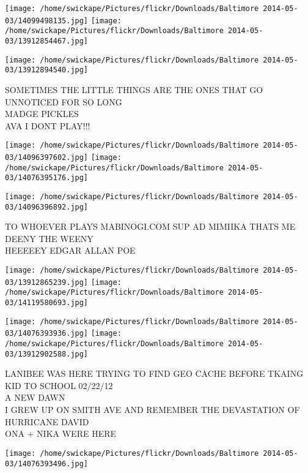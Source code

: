 \documentclass[10pt,letterpaper]{article}
\begin{document}
\texttt{[image: /home/swickape/Pictures/flickr/Downloads/Baltimore 2014-05-03/14099498135.jpg]}
\texttt{[image: /home/swickape/Pictures/flickr/Downloads/Baltimore 2014-05-03/13912854467.jpg]}

\vspace{0.25in}
\texttt{[image: /home/swickape/Pictures/flickr/Downloads/Baltimore 2014-05-03/13912894540.jpg]}

SOMETIMES THE LITTLE THINGS ARE THE ONES THAT GO UNNOTICED FOR SO LONG\\
MADGE PICKLES\\
AVA I DONT PLAY!!!\\
\pagebreak

\texttt{[image: /home/swickape/Pictures/flickr/Downloads/Baltimore 2014-05-03/14096397602.jpg]}
\texttt{[image: /home/swickape/Pictures/flickr/Downloads/Baltimore 2014-05-03/14076395176.jpg]}

\vspace{0.25in}
\texttt{[image: /home/swickape/Pictures/flickr/Downloads/Baltimore 2014-05-03/14096396892.jpg]}

TO WHOEVER PLAYS MABINOGI.COM SUP AD MIMIIKA THATS ME\\
DEENY THE WEENY\\
HEEEEEY EDGAR ALLAN POE\\
\pagebreak

\texttt{[image: /home/swickape/Pictures/flickr/Downloads/Baltimore 2014-05-03/13912865239.jpg]}
\texttt{[image: /home/swickape/Pictures/flickr/Downloads/Baltimore 2014-05-03/14119580693.jpg]}

\texttt{[image: /home/swickape/Pictures/flickr/Downloads/Baltimore 2014-05-03/14076393936.jpg]}
\texttt{[image: /home/swickape/Pictures/flickr/Downloads/Baltimore 2014-05-03/13912902588.jpg]}

LANIBEE WAS HERE TRYING TO FIND GEO CACHE BEFORE TKAING KID TO SCHOOL 02/22/12\\
A NEW DAWN\\
I GREW UP ON SMITH AVE AND REMEMBER THE DEVASTATION OF HURRICANE DAVID\\
ONA + NIKA WERE HERE\\
\pagebreak

\texttt{[image: /home/swickape/Pictures/flickr/Downloads/Baltimore 2014-05-03/14076393496.jpg]}
\end{document}
